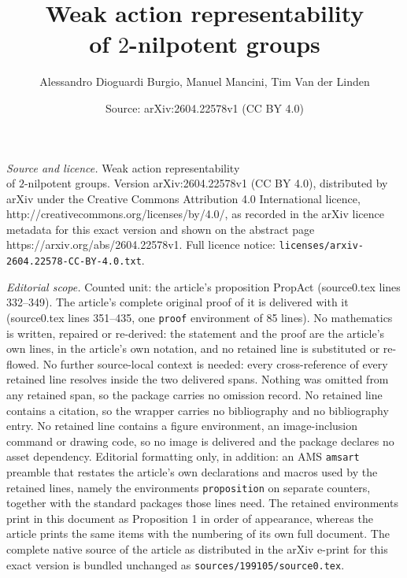 \documentclass[10pt,a4paper]{amsart}
\title{Weak action representability\\of \texorpdfstring{\(2\)}{2}-nilpotent groups}
\author{Alessandro Dioguardi Burgio, Manuel Mancini, Tim Van der Linden}
\date{Source: arXiv:2604.22578v1 (CC BY 4.0)}
\begin{document}
\maketitle

\noindent\emph{Source and licence.} Weak action representability\\of \texorpdfstring{\(2\)}{2}-nilpotent groups. Version arXiv:2604.22578v1 (CC BY 4.0), distributed by arXiv under the Creative Commons Attribution 4.0 International licence, http://creativecommons.org/licenses/by/4.0/, as recorded in the arXiv licence metadata for this exact version and shown on the abstract page https://arxiv.org/abs/2604.22578v1. Full licence notice: \texttt{licenses/arxiv-2604.22578-CC-BY-4.0.txt}.\par\smallskip

\noindent\textit{Editorial scope.} Counted unit: the article's proposition PropAct (source0.tex lines 332--349). The article's complete original proof of it is delivered with it (source0.tex lines 351--435, one \texttt{proof} environment of 85 lines). No mathematics is written, repaired or re-derived: the statement and the proof are the article's own lines, in the article's own notation, and no retained line is substituted or re-flowed.  No further source-local context is needed: every cross-reference of every retained line resolves inside the two delivered spans.  Nothing was omitted from any retained span, so the package carries no omission record.  No retained line contains a citation, so the wrapper carries no bibliography and no bibliography entry.  No retained line contains a figure environment, an image-inclusion command or drawing code, so no image is delivered and the package declares no asset dependency.  Editorial formatting only, in addition: an AMS \texttt{amsart} preamble that restates the article's own declarations and macros used by the retained lines, namely the environments \texttt{proposition} on separate counters, together with the standard packages those lines need.  The retained environments print in this document as Proposition 1 in order of appearance, whereas the article prints the same items with the numbering of its own full document.  The complete native source of the article as distributed in the arXiv e-print for this exact version is bundled unchanged as \texttt{sources/199105/source0.tex}.
\end{document}
